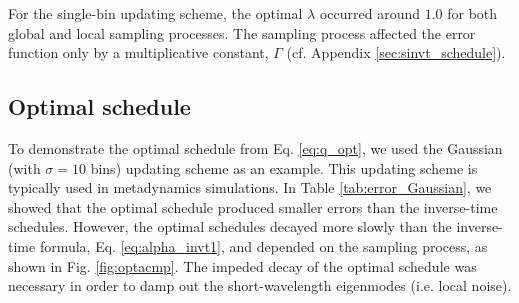 \documentclass[preprint, floatfix]{revtex4-1}
\begin{document}
For the single-bin updating scheme,
the optimal $\lambda$ occurred around $1.0$
for both global and local sampling processes.
%
The sampling process affected the error function
only by a multiplicative constant, $\Gamma$
(cf. Appendix \ref{sec:sinvt_schedule}).
%




\subsection{\label{sec:results_optschedule}
Optimal schedule}



To demonstrate the optimal schedule from Eq. \eqref{eq:q_opt},
we used the Gaussian (with $\sigma = 10$ bins) updating scheme
as an example.
%
This updating scheme is typically used in metadynamics simulations.
%
In Table \ref{tab:error_Gaussian},
we showed that the optimal schedule
produced smaller errors than
the inverse-time schedules.
%
However, the optimal schedules
decayed more slowly than
the inverse-time formula, Eq. \eqref{eq:alpha_invt1},
and depended on the sampling process,
as shown in Fig. \ref{fig:optacmp}.
%
The impeded decay of the optimal schedule
was necessary in order to
damp out the short-wavelength eigenmodes
(i.e. local noise).
%
\end{document}
